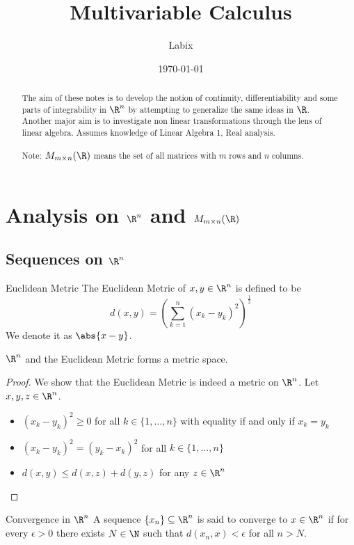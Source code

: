\documentclass[a4paper]{article}
\title{Multivariable Calculus}
\author{Labix}
\date{\today}
\begin{document}
\maketitle
\begin{abstract}
The aim of these notes is to develop the notion of continuity, differentiability and some parts of integrability in $\R^n$ by attempting to generalize the same ideas in $\R$. Another major aim is to investigate non linear transformations  through the lens of linear algebra. \linebreak\linebreak
Assumes knowledge of Linear Algebra 1, Real analysis. \\~\\
Note: $M_{m\times n}(\R)$ means the set of all matrices with $m$ rows and $n$ columns. 
\end{abstract}
\pagebreak
\tableofcontents
\pagebreak
\section{Analysis on $\R^n$ and $M_{m\times n}(\R)$}
\subsection{Sequences on $\R^n$}
\begin{defn}{Euclidean Metric}{} The Euclidean Metric of $x,y\in\R^n$ is defined to be $$d(x,y)=\left(\sum_{k=1}^n(x_k-y_k)^2\right)^{\frac{1}{2}}$$ We denote it as $\abs{x-y}$. 
\end{defn}

\begin{prp}{}{} $\R^n$ and the Euclidean Metric forms a metric space. \tcbline
\begin{proof} We show that the Euclidean Metric is indeed a metric on $\R^n$. Let $x,y,z\in\R^n$. 
\begin{itemize}
\item $(x_k-y_k)^2\geq 0$ for all $k\in\{1,\dots,n\}$ with equality if and only if $x_k=y_k$
\item $(x_k-y_k)^2=(y_k-x_k)^2$ for all $k\in\{1,\dots,n\}$
\item $d(x,y)\leq d(x,z)+d(y,z)$ for any $z\in\R^n$
\end{itemize}
\end{proof}
\end{prp}

\begin{defn}{Convergence in $\R^n$}{} A sequence $\{x_n\}\subseteq\R^n$ is said to converge to $x\in\R^n$ if for every $\epsilon>0$ there exists $N\in\N$ such that $d(x_n,x)<\epsilon$ for all $n>N$. 
\end{defn}
\end{document}
